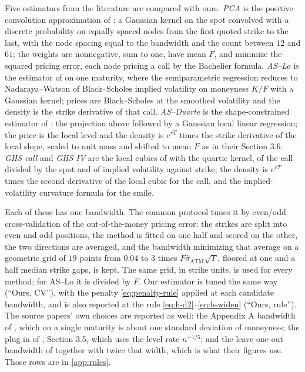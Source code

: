 \documentclass[preprint,12pt,authoryear,times]{elsarticle}
\begin{document}
Five estimators from the literature are compared with ours. \emph{PCA} is the positive convolution approximation of \citeauthor{bondarenko2003}: a Gaussian kernel on the spot convolved with a discrete probability on equally spaced nodes from the first quoted strike to the last, with the node spacing equal to the bandwidth and the count between \(12\) and \(61\); the weights are nonnegative, sum to one, have mean \(F\), and minimize the squared pricing error, each node pricing a call by the Bachelier formula. \emph{AS--Lo} is the estimator of \citeauthor{aitsahalia1998} on one maturity, where the semiparametric regression reduces to Nadaraya--Watson of Black--Scholes implied volatility on moneyness \(K/F\) with a Gaussian kernel; prices are Black--Scholes at the smoothed volatility and the density is the strike derivative of that call. \emph{AS--Duarte} is the shape-constrained estimator of \citeauthor{aitsahalia2003}: the projection above followed by a Gaussian local linear regression; the price is the local level and the density is \(e^{rT}\) times the strike derivative of the local slope, scaled to unit mass and shifted to mean \(F\) as in their Section 3.6. \emph{GHS call} and \emph{GHS IV} are the local cubics of \citeauthor{grith2012} with the quartic kernel, of the call divided by the spot and of implied volatility against strike; the density is \(e^{rT}\) times the second derivative of the local cubic for the call, and the implied-volatility curvature formula for the smile.

Each of these has one bandwidth. The common protocol tunes it by even/odd cross-validation of the out-of-the-money pricing error: the strikes are split into even and odd positions, the method is fitted on one half and scored on the other, the two directions are averaged, and the bandwidth minimizing that average on a geometric grid of \(19\) points from \(0.04\) to \(3\) times \(F\hat\sigma_{\mathrm{ATM}}\sqrt T\), floored at one and a half median strike gaps, is kept. The same grid, in strike units, is used for every method; for AS--Lo it is divided by \(F\). Our estimator is tuned the same way (``Ours, CV''), with the penalty \eqref{eq:penalty-rule} applied at each candidate bandwidth, and is also reported at the rule \eqref{eq:h-d2}--\eqref{eq:h-widen} (``Ours, rule''). The source papers' own choices are reported as well: the Appendix A bandwidth of \citeauthor{aitsahalia1998}, which on a single maturity is about one standard deviation of moneyness; the \citet{fangijbels1996} plug-in of \citeauthor{aitsahalia2003}, Section 3.5, which uses the level rate \(n^{-1/5}\); and the leave-one-out bandwidth of \citeauthor{grith2012} together with twice that width, which is what their figures use. Those rows are in \ref{app:rules}.
\end{document}
